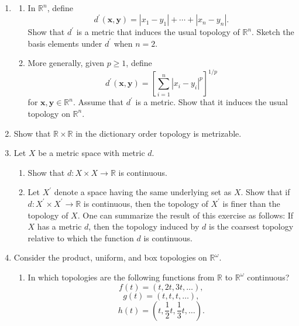 \begin{enumerate}[itemsep=0.4em, parsep=0pt, topsep=0pt, partopsep=0pt, leftmargin=*, label=\arabic*., ref=\arabic*]
\item
  \begin{enumerate}[itemsep=0.2em, parsep=0pt, topsep=0pt, partopsep=0pt, leftmargin=*, label=(\alph*), align=left]
  \item In \(\mathbb{R}^{n}\), define \[ d^{\prime }( {\mathbf{x},\mathbf{y}}) = | {x_{1} - y_{1}}| + \cdots + | {x_{n} - y_{n}}| . \] Show that \(d^{\prime }\) is a metric that induces the usual topology of \(\mathbb{R}^{n}\). Sketch the basis elements under \(d^{\prime }\) when \(n = 2\).

  \item More generally, given \(p \geq 1\), define \[ d^{\prime }( {\mathbf{x},\mathbf{y}}) = {[ \mathop{\sum }\limits_{{i = 1}}^{n}{| x_{i} - y_{i}| }^{p}] }^{1/p} \] for \(\mathbf{x},\mathbf{y} \in {\mathbb{R}}^{n}\). Assume that \(d^{\prime }\) is a metric. Show that it induces the usual topology on \(\mathbb{R}^{n}\).
  \end{enumerate}
\item Show that \(\mathbb{R} \times \mathbb{R}\) in the dictionary order topology is metrizable.
\item Let \(X\) be a metric space with metric \(d\).
  \begin{enumerate}[itemsep=0.2em, parsep=0pt, topsep=0pt, partopsep=0pt, leftmargin=*, label=(\alph*), align=left]
  \item Show that \(d : X \times X \rightarrow \mathbb{R}\) is continuous.
  \item Let \(X^{\prime }\) denote a space having the same underlying set as \(X\). Show that if \(d : X^{\prime } \times {X}^{\prime } \rightarrow \mathbb{R}\) is continuous, then the topology of \(X^{\prime }\) is finer than the topology of \(X\). One can summarize the result of this exercise as follows: If \(X\) has a metric \(d\), then the topology induced by \(d\) is the coarsest topology relative to which the function \(d\) is continuous.
  \end{enumerate}
\item Consider the product, uniform, and box topologies on \(\mathbb{R}^{\omega }\).
  \begin{enumerate}[itemsep=0.2em, parsep=0pt, topsep=0pt, partopsep=0pt, leftmargin=*, label=(\alph*), align=left]
  \item In which topologies are the following functions from \(\mathbb{R}\) to \(\mathbb{R}^{\omega }\) continuous? \[ f( t) = ( {t,{2t},{3t},\ldots }), \] \[ g( t) = ( {t,t,t,\ldots }), \] \[ h( t) = ( {t,\frac{1}{2}t,\frac{1}{3}t,\ldots }). \]

\end{enumerate}
\end{enumerate}
